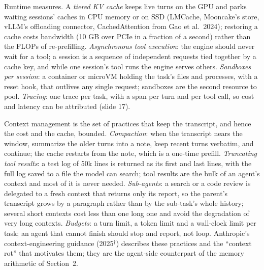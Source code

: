 \documentclass[11pt,letterpaper]{article}
\begin{document}
Runtime measures. A \emph{tiered KV cache} keeps live turns on the GPU and parks waiting sessions' caches in CPU memory or on SSD (LMCache, Mooncake's store, vLLM's offloading connector, CachedAttention from Gao et al.\ 2024); restoring a cache costs bandwidth (10 GB over PCIe in a fraction of a second) rather than the FLOPs of re-prefilling. \emph{Asynchronous tool execution}: the engine should never wait for a tool; a session is a sequence of independent requests tied together by a cache key, and while one session's tool runs the engine serves others. \emph{Sandboxes per session}: a container or microVM holding the task's files and processes, with a reset hook, that outlives any single request; sandboxes are the second resource to pool. \emph{Tracing}: one trace per task, with a span per turn and per tool call, so cost and latency can be attributed (slide 17).

Context management is the set of practices that keep the transcript, and hence the cost and the cache, bounded. \emph{Compaction}: when the transcript nears the window, summarize the older turns into a note, keep recent turns verbatim, and continue; the cache restarts from the note, which is a one-time prefill. \emph{Truncating tool results}: a test log of 50k lines is returned as its first and last lines, with the full log saved to a file the model can search; tool results are the bulk of an agent's context and most of it is never needed. \emph{Sub-agents}: a search or a code review is delegated to a fresh context that returns only its report, so the parent's transcript grows by a paragraph rather than by the sub-task's whole history; several short contexts cost less than one long one and avoid the degradation of very long contexts. \emph{Budgets}: a turn limit, a token limit and a wall-clock limit per task; an agent that cannot finish should stop and report, not loop. Anthropic's context-engineering guidance (2025$^\dagger$) describes these practices and the ``context rot'' that motivates them; they are the agent-side counterpart of the memory arithmetic of Section~2.
\end{document}
